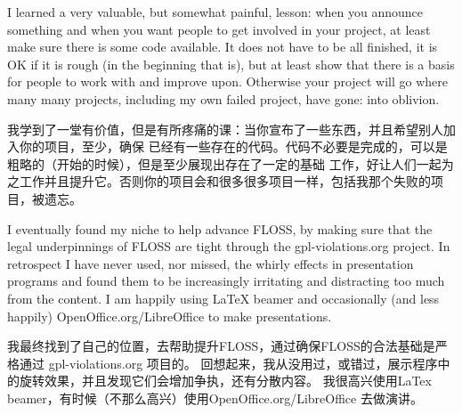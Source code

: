 I learned a very valuable, but somewhat painful, lesson: when you announce
something and when you want people to get involved in your project, at least
make sure there is some code available. It does not have to be all finished, it
is OK if it is rough (in the beginning that is), but at least show that there is
a basis for people to work with and improve upon. Otherwise your project will go
where many many projects, including my own failed project, have gone: into
oblivion.

我学到了一堂有价值，但是有所疼痛的课：当你宣布了一些东西，并且希望别人加入你的项目，至少，确保
已经有一些存在的代码。代码不必要是完成的，可以是粗略的（开始的时候），但是至少展现出存在了一定的基础
工作，好让人们一起为之工作并且提升它。否则你的项目会和很多很多项目一样，包括我那个失败的项目，被遗忘。


I eventually found my niche to help advance FLOSS, by making sure that the legal
underpinnings of FLOSS are tight through the gpl-violations.org project. In
retrospect I have never used, nor missed, the whirly effects in presentation
programs and found them to be increasingly irritating and distracting too much
from the content. I am happily using LaTeX beamer and occasionally (and less
happily) OpenOffice.org/LibreOffice to make presentations.

我最终找到了自己的位置，去帮助提升FLOSS，通过确保FLOSS的合法基础是严格通过 gpl-violations.org 项目的。
回想起来，我从没用过，或错过，展示程序中的旋转效果，并且发现它们会增加争执，还有分散内容。
我很高兴使用LaTex beamer，有时候（不那么高兴）使用OpenOffice.org/LibreOffice 去做演讲。
